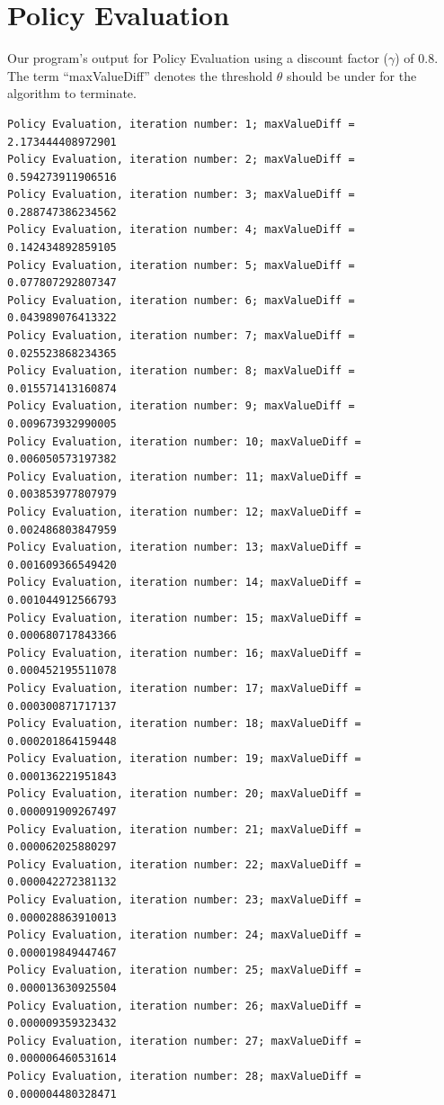 \documentclass{article}
\begin{document}
\section{Policy Evaluation} \label{app:firstShould}
Our program's output for Policy Evaluation using a discount factor ($\gamma$) of 0.8.\\
The term ``maxValueDiff'' denotes the threshold $\theta$ should be under for the algorithm to terminate.
\begin{scriptsize}
\begin{verbatim}
Policy Evaluation, iteration number: 1; maxValueDiff = 2.173444408972901 
Policy Evaluation, iteration number: 2; maxValueDiff = 0.594273911906516 
Policy Evaluation, iteration number: 3; maxValueDiff = 0.288747386234562 
Policy Evaluation, iteration number: 4; maxValueDiff = 0.142434892859105 
Policy Evaluation, iteration number: 5; maxValueDiff = 0.077807292807347 
Policy Evaluation, iteration number: 6; maxValueDiff = 0.043989076413322 
Policy Evaluation, iteration number: 7; maxValueDiff = 0.025523868234365 
Policy Evaluation, iteration number: 8; maxValueDiff = 0.015571413160874 
Policy Evaluation, iteration number: 9; maxValueDiff = 0.009673932990005 
Policy Evaluation, iteration number: 10; maxValueDiff = 0.006050573197382 
Policy Evaluation, iteration number: 11; maxValueDiff = 0.003853977807979 
Policy Evaluation, iteration number: 12; maxValueDiff = 0.002486803847959 
Policy Evaluation, iteration number: 13; maxValueDiff = 0.001609366549420 
Policy Evaluation, iteration number: 14; maxValueDiff = 0.001044912566793 
Policy Evaluation, iteration number: 15; maxValueDiff = 0.000680717843366 
Policy Evaluation, iteration number: 16; maxValueDiff = 0.000452195511078 
Policy Evaluation, iteration number: 17; maxValueDiff = 0.000300871717137 
Policy Evaluation, iteration number: 18; maxValueDiff = 0.000201864159448 
Policy Evaluation, iteration number: 19; maxValueDiff = 0.000136221951843 
Policy Evaluation, iteration number: 20; maxValueDiff = 0.000091909267497 
Policy Evaluation, iteration number: 21; maxValueDiff = 0.000062025880297 
Policy Evaluation, iteration number: 22; maxValueDiff = 0.000042272381132 
Policy Evaluation, iteration number: 23; maxValueDiff = 0.000028863910013 
Policy Evaluation, iteration number: 24; maxValueDiff = 0.000019849447467 
Policy Evaluation, iteration number: 25; maxValueDiff = 0.000013630925504 
Policy Evaluation, iteration number: 26; maxValueDiff = 0.000009359323432 
Policy Evaluation, iteration number: 27; maxValueDiff = 0.000006460531614 
Policy Evaluation, iteration number: 28; maxValueDiff = 0.000004480328471 

\end{verbatim}
\end{scriptsize}
\end{document}
